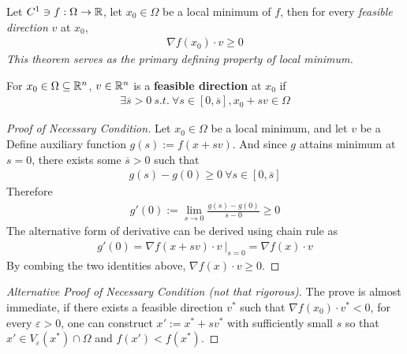 \documentclass{article}
\begin{document}
   	\begin{theorem}
   		Let $C^1 \ni f: \Omega \to \mathbb{R}$, let $x_0 \in \Omega$ be a local minimum of $f$, then for every \emph{feasible direction} $v$ at $x_0$,
   		\begin{align}
   			\nabla f(x_0) \cdot v \geq 0
   		\end{align}
   		\emph{This theorem serves as the primary defining property of local minimum.}
   	\end{theorem}
   	
   	\begin{definition}
   		For $x_0 \in \Omega \subseteq \mathbb{R}^n$,  $v \in \mathbb{R}^n$ is a \textbf{feasible direction} at $x_0$ if
   		\begin{align}
   			\exists \overline{s} > 0\ s.t.\ \forall s \in [0, \overline{s}], x_0 + s v \in \Omega
   		\end{align}
   	\end{definition}
   	
   	\begin{proof}[Proof of Necessary Condition]
   		Let $x_0 \in \Omega$ be a local minimum, and let $v$ be a 
   		Define auxiliary function $g(s) := f(x + sv)$. And since $g$ attains minimum at $s=0$, there exists some $\overline{s} > 0$ such that 
   		\begin{align}
   			g(s) - g(0) \geq 0\ \forall s \in [0, \overline{s}]
   		\end{align}
   		Therefore
   		\begin{align}
   			g'(0) := \lim_{s \to 0} \frac{g(s) - g(0)}{s - 0} \geq 0
   		\end{align}
   		The alternative form of derivative can be derived using chain rule as
   		\begin{align}
   			g'(0) = \nabla f(x + sv) \cdot v\ |_{s=0} = \nabla f(x) \cdot v
   		\end{align}
   		By combing the two identities above, $\nabla f(x) \cdot v \geq 0$.
   	\end{proof}
   	
   	\begin{proof}[Alternative Proof of Necessary Condition (not that rigorous)]
   		The prove is almost immediate, if there exists a feasible direction $v^*$ such that $\nabla f(x_0) \cdot v^* < 0$, for every $\varepsilon > 0$, one can construct $x' := x^* + s v^*$ with sufficiently small $s$ so that $x' \in V_\varepsilon(x^*) \cap  \Omega$ and $f(x') < f(x^*)$.
   	\end{proof}
   	
\end{document}
